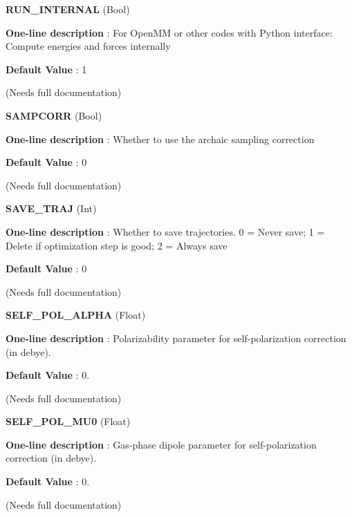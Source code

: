 \begin{DoxyItemize}
\item {\bfseries  R\-U\-N\-\_\-\-I\-N\-T\-E\-R\-N\-A\-L } (Bool) \par
{\bfseries  One-\/line description }\-: For Open\-M\-M or other codes with Python interface\-: Compute energies and forces internally \par
{\bfseries  Default Value }\-: 1 \par
(Needs full documentation)\end{DoxyItemize}
\begin{DoxyItemize}
\item {\bfseries  S\-A\-M\-P\-C\-O\-R\-R } (Bool) \par
{\bfseries  One-\/line description }\-: Whether to use the archaic sampling correction \par
{\bfseries  Default Value }\-: 0 \par
(Needs full documentation)\end{DoxyItemize}
\begin{DoxyItemize}
\item {\bfseries  S\-A\-V\-E\-\_\-\-T\-R\-A\-J } (Int) \par
{\bfseries  One-\/line description }\-: Whether to save trajectories. 0 = Never save; 1 = Delete if optimization step is good; 2 = Always save \par
{\bfseries  Default Value }\-: 0 \par
(Needs full documentation)\end{DoxyItemize}
\begin{DoxyItemize}
\item {\bfseries  S\-E\-L\-F\-\_\-\-P\-O\-L\-\_\-\-A\-L\-P\-H\-A } (Float) \par
{\bfseries  One-\/line description }\-: Polarizability parameter for self-\/polarization correction (in debye). \par
{\bfseries  Default Value }\-: 0. \par
(Needs full documentation)\end{DoxyItemize}
\begin{DoxyItemize}
\item {\bfseries  S\-E\-L\-F\-\_\-\-P\-O\-L\-\_\-\-M\-U0 } (Float) \par
{\bfseries  One-\/line description }\-: Gas-\/phase dipole parameter for self-\/polarization correction (in debye). \par
{\bfseries  Default Value }\-: 0. \par
(Needs full documentation)\end{DoxyItemize}
